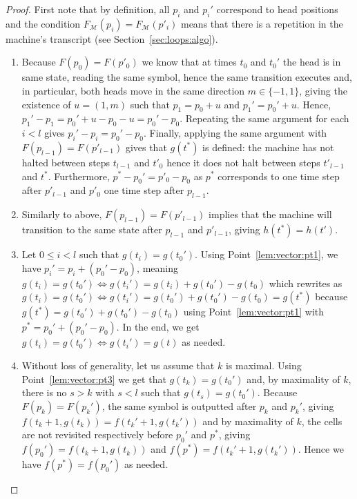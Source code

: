 \begin{proof}
    First note that by definition, all $p_i$ and $p_i'$ correspond to head positions and the condition $F_\mathcal{M}(p_i)   = F_\mathcal{M}(p'_i)$ means that there is a repetition in the machine's transcript (see Section~\ref{sec:loops:algo}).
    \begin{enumerate}
        \item Because $F(p_0) = F(p'_0)$ we know that at times $t_0$ and $t_0'$ the head is in same state, reading the same symbol, hence the same transition executes and, in particular, both heads move in the same direction $m \in \{-1,1\}$, giving the existence of $u = (1, m)$ such that $p_1 = p_0 + u$ and $p_1' = p_0' + u$. Hence, $p_1' - p_1 = p_0' + u - p_0 - u = p_0' - p_0$. Repeating the same argument for each $i < l$ gives $p_i' - p_i = p_0' - p_0$. Finally, applying the same argument with $F(p_{l-1}) = F(p'_{l-1})$ gives that $g(t^*)$ is defined: the machine has not halted between steps $t_{l-1}$ and $t'_0$ hence it does not halt between steps $t'_{l-1}$ and $t^*$. Furthermore, $p^*-p_0' = p'_0 - p_0$ as $p^*$ corresponds to one time step after $p'_{l-1}$ and $p'_0$ one time step after $p_{l-1}$.
        \item Similarly to above, $F(p_{l-1}) = F(p'_{l-1})$ implies that the machine will transition to the same state after $p_{l-1}$ and $p'_{l-1}$, giving $h(t^*) = h(t')$.

        \item Let $0 \leq i < l$ such that $g(t_i) = g(t_0')$. Using Point~\ref{lem:vector:pt1}, we have $p_i' = p_i + (p_0' - p_0)$, meaning $g(t_i) = g(t_0') \Leftrightarrow g(t_i') = g(t_i) + g(t_0') - g(t_0)$ which rewrites as $g(t_i) = g(t_0') \Leftrightarrow g(t_i') = g(t_0') + g(t_0') - g(t_0) = g(t^*)$ because $g(t^*) = g(t_0') + g(t_0') - g(t_0)$ using Point~\ref{lem:vector:pt1} with $p^* = p_0' + (p_0' - p_0)$. In the end, we get $g(t_i) = g(t_0') \Leftrightarrow g(t_i') = g(t)$ as needed.

        \item Without loss of generality, let us assume that $k$ is maximal. Using Point~\ref{lem:vector:pt3} we get that $g(t_k) = g(t_0')$ and, by maximality of $k$, there is no $s > k$ with $s <l$ such that $g(t_s) = g(t_0')$. Because $F(p_k) = F(p_k')$, the same symbol is outputted after $p_k$ and $p_k'$, giving $f(t_k+1,g(t_k)) = f(t_k'+1,g(t_k'))$ and by maximality of $k$, the cells are not revisited respectively before $p_0'$ and $p^*$, giving $f(p_0') = f(t_k+1,g(t_k))$ and $f(p^*) = f(t_k'+1,g(t_k'))$. Hence we have $f(p^*) = f(p_0')$ as needed.


    \end{enumerate}

\end{proof}

